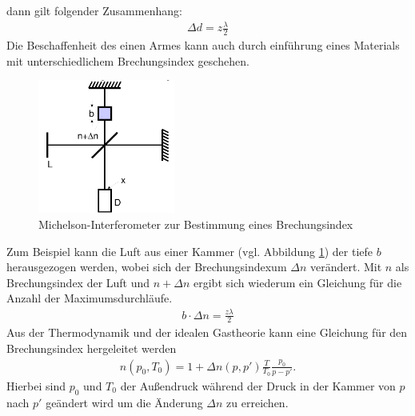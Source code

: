 dann gilt folgender Zusammenhang:
\begin{align}
    \Delta d = z \frac{\lambda}{2}
    \label{eq:d_mod}
\end{align} 
Die Beschaffenheit des einen Armes kann auch durch einführung eines Materials mit unterschiedlichem Brechungsindex 
geschehen.
\begin{figure}
    \centering
    \includegraphics[width=0.4\textwidth]{18_v401/Abbildungen/Screenshot 2023-06-17 170025.png}
    \caption{Michelson-Interferometer zur Bestimmung eines Brechungsindex \cite{man:v401}}
    \label{fig:schema_b}
\end{figure}
Zum Beispiel kann die Luft aus einer Kammer (vgl. Abbildung \ref{fig:schema_b}) der tiefe $b$ herausgezogen werden,
wobei sich der Brechungsindexum $\Delta n$ verändert.
Mit $n$ als Brechungsindex der Luft und $n + \Delta n$ ergibt sich wiederum ein Gleichung für die Anzahl der Maximumsdurchläufe.
\begin{align}
    b \cdot \Delta n = \frac{z \lambda}{2}
    \label{eq:n_mod}
\end{align}
Aus der Thermodynamik und der idealen Gastheorie kann eine Gleichung für den Brechungsindex hergeleitet werden
\begin{align}
    n(p_0, T_0) = 1 + \Delta n(p, p') \frac{T}{T_0} \frac{p_0}{p-p'}.
    \label{eq:p_primed}
\end{align}
Hierbei sind $p_0$ und $T_0$ der Außendruck während der Druck in der Kammer von $p$ nach $p'$ geändert wird 
um die Änderung $\Delta n$ zu erreichen.

